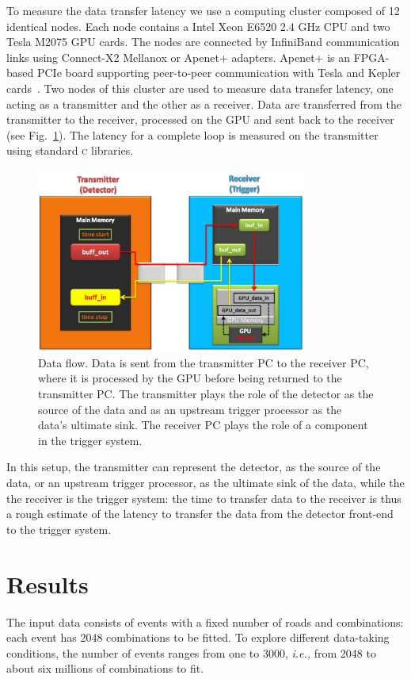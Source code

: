 \documentclass[a4]{jpconf}
\begin{document}
To measure the data transfer latency we use a computing cluster composed of 
12 identical nodes.  Each node contains a Intel Xeon E6520 2.4 GHz 
CPU and two Tesla M2075 GPU cards. The nodes are connected by InfiniBand 
communication links using Connect-X2 Mellanox or Apenet+ adapters. 
Apenet+ is an FPGA-based PCIe board supporting peer-to-peer communication with 
Tesla and Kepler cards~\cite{apenet2010}.
Two nodes of this cluster are used to measure data transfer latency,
one acting as a transmitter and the
other as a receiver.  Data are transferred from the transmitter to the 
receiver, processed on the GPU and sent back to the receiver (see
Fig.~\ref{fig:data_flow}).  
The latency for a complete loop is measured on the transmitter using 
standard \textsc{c} libraries.
\begin{figure}[btp]
\centering
\includegraphics[width=3.5in]{figures/SetUp-general}
\caption{Data flow. Data is sent from the transmitter PC to the
  receiver PC, where it is processed by the GPU before being returned
  to the transmitter PC. The transmitter plays the role of the
  detector as the source of the data and as an upstream trigger
  processor as the data's ultimate sink. The receiver PC plays the
  role of a component in the trigger system. }
\label{fig:data_flow}
\end{figure}
In this setup, the transmitter can represent the detector, as
the source of the data, or an upstream trigger processor, as
the ultimate sink of the data, while the the receiver is the
trigger system: the time to transfer data to the receiver is thus a
rough estimate of the latency to transfer the data from the detector
front-end to the trigger system.

\section{Results}
The input data consists of events with a fixed number of roads and
combinations: each event has 2048 combinations to be fitted. To
explore different data-taking conditions, the number of events ranges
from one to 3000, \emph{i.e.,} from 2048 to about six millions of combinations
to fit.
 
\end{document}
